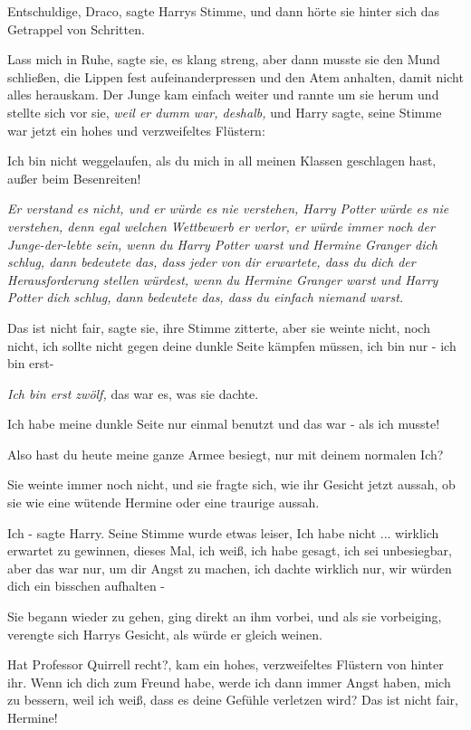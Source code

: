 \glqq{}Entschuldige, Draco\grqq{}, sagte Harrys Stimme, und dann hörte sie hinter
sich das Getrappel von Schritten.

\glqq{}Lass mich in Ruhe\grqq{}, sagte sie, es klang streng, aber dann musste sie
den Mund schließen, die Lippen fest aufeinanderpressen und den Atem anhalten,
damit nicht alles herauskam. Der Junge kam einfach weiter und rannte um sie
herum und stellte sich vor sie, \emph{weil er dumm war, deshalb,} und Harry
sagte, seine Stimme war jetzt ein hohes und verzweifeltes Flüstern:

\glqq{}Ich bin nicht weggelaufen, als du mich in all meinen Klassen geschlagen
hast, außer beim Besenreiten!\grqq{}

\emph{Er verstand es nicht, und er würde es nie verstehen, Harry Potter würde es
nie verstehen, denn egal welchen Wettbewerb er verlor, er würde immer noch der
Junge-der-lebte sein, wenn du Harry Potter warst und Hermine Granger dich
schlug, dann bedeutete das, dass jeder von dir erwartete, dass du dich der
Herausforderung stellen würdest, wenn du Hermine Granger warst und Harry Potter
dich schlug, dann bedeutete das, dass du einfach niemand warst.}

\glqq{}Das ist nicht fair\grqq{}, sagte sie, ihre Stimme zitterte, aber sie
weinte nicht, noch nicht, \glqq{}ich sollte nicht gegen deine dunkle Seite
kämpfen müssen, ich bin nur - ich bin erst-\grqq{}

\emph{Ich bin erst zwölf,} das war es, was sie dachte.

\glqq{}Ich habe meine dunkle Seite nur einmal benutzt und das war - als ich
musste!\grqq{}

\glqq{}Also hast du heute meine ganze Armee besiegt, nur mit deinem normalen
Ich?\grqq{}

Sie weinte immer noch nicht, und sie fragte sich, wie ihr Gesicht jetzt aussah,
ob sie wie eine wütende Hermine oder eine traurige aussah.

\glqq{}Ich -\grqq{} sagte Harry. Seine Stimme wurde etwas leiser, \glqq{}Ich habe
nicht ... wirklich erwartet zu gewinnen, dieses Mal, ich weiß, ich habe gesagt,
ich sei unbesiegbar, aber das war nur, um dir Angst zu machen, ich dachte
wirklich nur, wir würden dich ein bisschen aufhalten -\grqq{}

Sie begann wieder zu gehen, ging direkt an ihm vorbei, und als sie vorbeiging,
verengte sich Harrys Gesicht, als würde er gleich weinen.

\glqq{}Hat Professor Quirrell recht?\grqq{}, kam ein hohes, verzweifeltes
Flüstern von hinter ihr. \glqq{}Wenn ich dich zum Freund habe, werde ich dann
immer Angst haben, mich zu bessern, weil ich weiß, dass es deine Gefühle
verletzen wird? Das ist nicht fair, Hermine!\grqq{}

